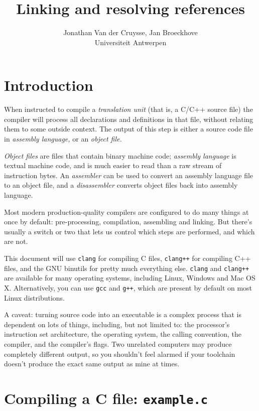 \documentclass[12pt,a4paper]{article}
\author{Jonathan Van der Cruysse, Jan Broeckhove \\ Universiteit Antwerpen}
\title{Linking and resolving references}
\newcommand{\C}{C}
\newcommand{\Cpp}{C++}
\newcommand{\CCpp}{\C/\Cpp}
\newcommand{\gcc}{\texttt{gcc}}
\newcommand{\gXX}{\texttt{g++}}
\newcommand{\clang}{\texttt{clang}}
\newcommand{\clangXX}{\texttt{clang++}}
\newcommand{\CC}{\clang{}}
\newcommand{\CXX}{\clangXX{}}
\begin{document}
	
\maketitle

\section{Introduction}

When instructed to compile a \emph{translation unit} (that is, a \CCpp{} source file) the compiler will process all declarations and definitions in that file, without relating them to some outside context. The output of this step is either a source code file in \emph{assembly language,} or an \emph{object file.} 

\emph{Object files} are files that contain binary machine code; \emph{assembly language} is textual machine code, and is much easier to read than a raw stream of instruction bytes. An \emph{assembler} can be used to convert an assembly language file to an object file, and a \emph{disassembler} converts object files back into assembly language. 

Most modern production-quality compilers are configured to do many things at once by default: pre-processing, compilation, assembling and linking. But there's usually a switch or two that lets us control which steps are performed, and which are not. 

This document will use \CC{} for compiling \C{} files, \CXX{} for compiling \Cpp{} files, and the GNU binutils for pretty much everything else. \clang{} and \clangXX{} are available for many operating systems, including Linux, Windows and Mac OS X. Alternatively, you can use \gcc{} and \gXX{}, which are present by default on most Linux distributions. 

A caveat: turning source code into an executable is a complex process that is dependent on lots of things, including, but not limited to: the processor's instruction set architecture, the operating system, the calling convention, the compiler, and the compiler's flags. Two unrelated computers may produce completely different output, so you shouldn't feel alarmed if your toolchain doesn't produce the exact same output as mine at times.  

\section{Compiling a \C{} file: \texttt{example.c}}
\end{document}
